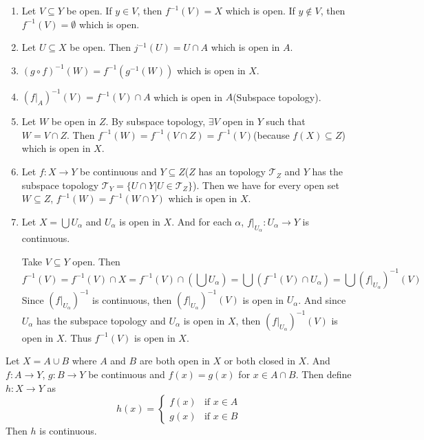 \documentclass[main.tex]{subfiles}
\begin{document}
\begin{enumerate}
    \item Let $V \subseteq Y$ be open. If $y \in V$, then $f^{-1}(V) = X$ which is open. If $y \notin V$, then $f^{-1}(V) = \emptyset$ which is open. 
    \item Let $U \subseteq X$ be open. Then $j^{-1}(U) = U \cap A$ which is open in $A$. 
    \item $(g\circ f)^{-1} (W) = f^{-1} (g^{-1} (W))$ which is open in $X$. 
    \item $(f|_A)^{-1} (V) = f^{-1} (V) \cap A$ which is open in $A$(Subspace topology). 
    \item Let $W$ be open in $Z$. By subspace topology, $\exists V$ open in $Y$ such that $W = V \cap Z$. Then $f^{-1} (W) = f^{-1} (V \cap Z) = f^{-1} (V)$(because $f(X) \subseteq Z$) which is open in $X$. 
    \item Let $f: X \rightarrow Y$ be continuous and $Y \subseteq Z$($Z$ has an topology $\mathcal{T}_Z$ and $Y$ has the subspace topology $\mathcal{T}_Y = \{U\cap Y| U\in \mathcal{T}_Z\}$). Then we have for every open set $W \subseteq Z$, $f^{-1} (W) = f^{-1} (W \cap Y)$ which is open in $X$. 
    \item Let $X = \bigcup U_{\alpha}$ and $U_{\alpha}$ is open in $X$. And for each $\alpha$, $f|_{U_{\alpha}}: U_{\alpha} \rightarrow Y$ is continuous. 
    \par Take $V \subseteq Y$ open. Then 
    \begin{equation}
        f^{-1} (V) = f^{-1} (V) \cap X = f^{-1} (V) \cap \left( \bigcup U_{\alpha} \right) = \bigcup \left( f^{-1} (V) \cap U_{\alpha} \right) = \bigcup (f|_{U_{\alpha}})^{-1} (V)
    \end{equation}
    Since $(f|_{U_{\alpha}})^{-1} $ is continuous, then $(f|_{U_{\alpha}})^{-1} (V)$ is open in $U_{\alpha}$. And since $U_{\alpha}$ has the subspace topology and $U_{\alpha}$ is open in $X$, then $(f|_{U_{\alpha}})^{-1} (V)$ is open in $X$. Thus $f^{-1} (V)$ is open in $X$. 
\end{enumerate}
\begin{theorem}
    Let $X = A \cup B$ where $A$ and $B$ are both open in $X$ or both closed in $X$. And $f: A \rightarrow Y$, $g: B \rightarrow Y$ be continuous and $f(x) = g(x)$ for $x \in A \cap B$. Then define $h: X \rightarrow Y$ as 
\[
h(x) = \begin{cases} 
f(x) & \text{if } x \in A \\
g(x) & \text{if } x \in B 
\end{cases}
\]
Then $h$ is continuous. 
\end{theorem}
\end{document}

